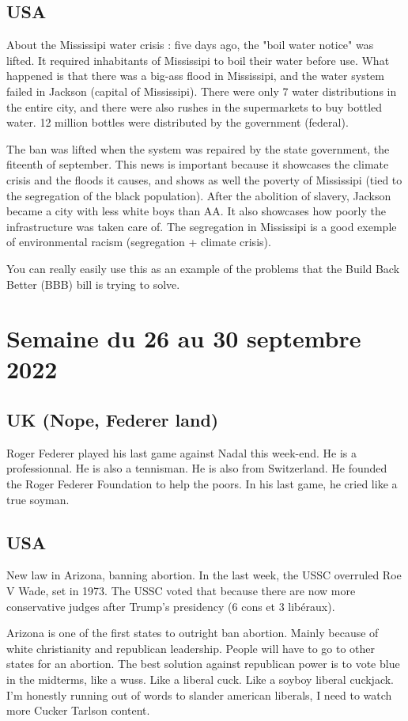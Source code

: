 \documentclass[a4paper,12pt]{book}
\begin{document}
\subsection{USA}
About the Mississipi water crisis : five days ago, the "boil water notice" was lifted. It required inhabitants of Mississipi to boil their water before use. What happened is that there was a big-ass flood in Mississipi, and the water system failed in Jackson (capital of Mississipi). There were only 7 water distributions in the entire city, and there were also rushes in the supermarkets to buy bottled water. 12 million bottles were distributed by the government (federal).
\par The ban was lifted when the system was repaired by the state government, the fiteenth of september. This news is important because it showcases the climate crisis and the floods it causes, and shows as well the poverty of Mississipi (tied to the segregation of the black population). After the abolition of slavery, Jackson became a city with less white boys than AA. It also showcases how poorly the infrastructure was taken care of. The segregation in Mississipi is a good exemple of environmental racism (segregation + climate crisis).
\par You can really easily use this as an example of the problems that the Build Back Better (BBB) bill is trying to solve.


\section{Semaine du 26 au 30 septembre 2022}
\subsection{UK (Nope, Federer land)}
Roger Federer played his last game against Nadal this week-end. He is a professionnal. He is also a tennisman. He is also from Switzerland. He founded the Roger Federer Foundation to help the poors. In his last game, he cried like a true soyman.

\subsection{USA}
New law in Arizona, banning abortion. In the last week, the USSC overruled Roe V Wade, set in 1973. The USSC voted that because there are now more conservative judges after Trump's presidency (6 cons et 3 libéraux).
\par Arizona is one of the first states to outright ban abortion. Mainly because of white christianity and republican leadership. People will have to go to other states for an abortion. The best solution against republican power is to vote blue in the midterms, like a wuss. Like a liberal cuck. Like a soyboy liberal cuckjack. I'm honestly running out of words to slander american liberals, I need to watch more Cucker Tarlson content.
\end{document}
